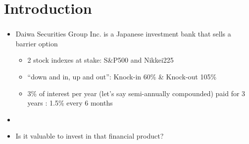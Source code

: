\section{Introduction}

\begin{frame}[c]
\frametitle{\insertsection}
\begin{itemize}
	\item Daiwa Securities Group Inc. is a Japanese investment bank that sells a barrier option %
	\begin{itemize}
		\item 2 stock indexes at stake: S\&P500 and Nikkei225
		\item “down and in, up and out”: Knock-in 60\% \& Knock-out 105\%
		\item 3\% of interest per year (let's say semi-annually compounded) paid for 3 years : 1.5\% every 6 months
	\end{itemize}
	\item []
	\item Is it valuable to invest in that financial product?
\end{itemize}
\end{frame}